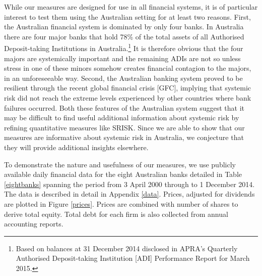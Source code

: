 \documentclass[12pt]{article}
\newcommand{\fref}[1]{Figure \ref{#1}}
\newcommand{\tref}[1]{Table \ref{#1}}
\newcommand{\aref}[1]{Appendix \ref{#1}}
\begin{document}

While our measures are designed for use in all financial systems, it is of particular interest to test them using the Australian setting for at least two reasons. First, the Australian financial system is dominated by only four banks. In Australia there are four major banks that hold 78\% of the total assets of all Authorised Deposit-taking Institutions in  Australia.\footnote{Based on balances at 31 December 2014 disclosed in APRA's Quarterly Authorised Deposit-taking Institution [ADI] Performance Report for March 2015.} It is therefore obvious that the four majors are systemically important and the remaining ADIs are not so unless stress in one of these minors somehow creates financial contagion to the majors, in an unforeseeable way. Second, the Australian banking system proved to be resilient through the recent global financial crisis [GFC], implying that systemic risk did not reach the extreme levels experienced by other countries where bank failures occurred. Both these features of the Australian system suggest that it may be difficult to find useful additional information about systemic risk by refining quantitative measures like SRISK. Since we are able to show that our measures are informative about systemic risk in Australia, we conjecture that they will provide additional insights elsewhere.  

To demonstrate the nature and usefulness of our measures, we use publicly available daily financial data for the eight Australian banks detailed in \tref{eightbanks} spanning the period from  3 April 2000 through to 1 December 2014.  The data is described in detail in \aref{data}.  Prices, adjusted for dividends are plotted in \fref{prices}.  Prices are combined with number of shares to derive total equity. Total debt for each firm is also collected from annual accounting reports. %
\end{document}
